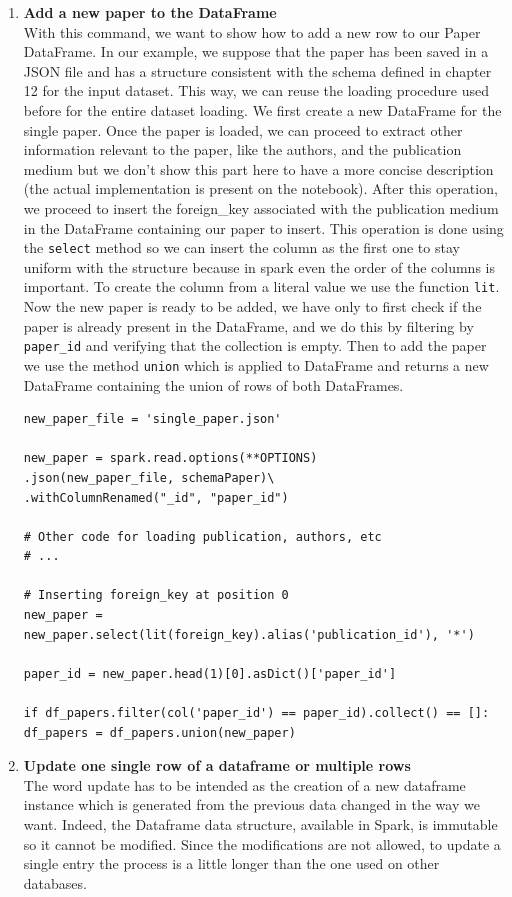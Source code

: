 \begin{enumerate}
    \item \textbf{Add a new paper to the DataFrame} \\
    With this command, we want to show how to add a new row to our Paper DataFrame.
    In our example, we suppose that the paper has been saved in a JSON file and has a structure consistent with the schema defined in chapter 12 for the input dataset.
    This way, we can reuse the loading procedure used before for the entire dataset loading.
    We first create a new DataFrame for the single paper.
    Once the paper is loaded, we can proceed to extract other information relevant to the paper, like the authors, and the publication medium but we don't show this part here to have a more concise description (the actual implementation is present on the notebook).
    After this operation, we proceed to insert the foreign\_key associated with the publication medium in the DataFrame containing our paper to insert.
    This operation is done using the \verb|select| method so we can insert the column as the first one to stay uniform with the structure because in spark even the order of the columns is important.
    To create the column from a literal value we use the function \verb|lit|.
    Now the new paper is ready to be added, we have only to first check if the paper is already present in the DataFrame, and we do this by filtering by \verb|paper_id| and verifying that the collection is empty.
    Then to add the paper we use the method \verb|union| which is applied to DataFrame and returns a new DataFrame containing the union of rows of both DataFrames.
    \begin{lstlisting}[label={lst:command1spark}]
new_paper_file = 'single_paper.json'

new_paper = spark.read.options(**OPTIONS)
.json(new_paper_file, schemaPaper)\
.withColumnRenamed("_id", "paper_id")

# Other code for loading publication, authors, etc
# ...

# Inserting foreign_key at position 0
new_paper = new_paper.select(lit(foreign_key).alias('publication_id'), '*')

paper_id = new_paper.head(1)[0].asDict()['paper_id']

if df_papers.filter(col('paper_id') == paper_id).collect() == []:
df_papers = df_papers.union(new_paper)
    \end{lstlisting}
    \item \textbf{Update one single row of a dataframe or multiple rows} \\
    The word update has to be intended as the creation of a new dataframe instance which is generated from the previous data changed in the way we want.
    Indeed, the Dataframe data structure, available in Spark, is immutable so it cannot be modified.
    Since the modifications are not allowed, to update a single entry the process is a little longer than the one used on other databases.


\end{enumerate}
